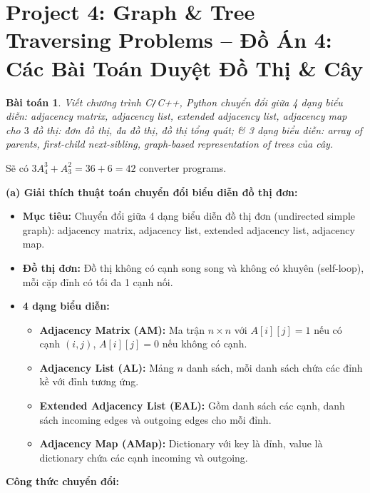 \documentclass{article}
\newtheorem{baitoan}{Bài toán}
\begin{document}

\section{Project 4: Graph \& Tree Traversing Problems -- Đồ Án 4: Các Bài Toán Duyệt Đồ Thị \& Cây}
\begin{baitoan}
    Viết chương trình {\sf C{\tt/}C++, Python} chuyển đổi giữa 4 dạng biểu diễn: adjacency matrix, adjacency list, extended adjacency list, adjacency map cho $3$ đồ thị: đơn đồ thị, đa đồ thị, đồ thị tổng quát; \& 3 dạng biểu diễn: array of parents, first-child next-sibling, graph-based representation of trees của cây.
\end{baitoan}
Sẽ có $3A_4^3 + A_3^2 = 36 + 6 = 42$ converter programs.


\textbf{(a) Giải thích thuật toán chuyển đổi biểu diễn đồ thị đơn:}

\begin{itemize}
    \item \textbf{Mục tiêu:} Chuyển đổi giữa 4 dạng biểu diễn đồ thị đơn (undirected simple graph): adjacency matrix, adjacency list, extended adjacency list, adjacency map.
    \item \textbf{Đồ thị đơn:} Đồ thị không có cạnh song song và không có khuyên (self-loop), mỗi cặp đỉnh có tối đa 1 cạnh nối.
    \item \textbf{4 dạng biểu diễn:}
    \begin{itemize}
        \item \textbf{Adjacency Matrix (AM):} Ma trận $n \times n$ với $A[i][j] = 1$ nếu có cạnh $(i,j)$, $A[i][j] = 0$ nếu không có cạnh.
        \item \textbf{Adjacency List (AL):} Mảng $n$ danh sách, mỗi danh sách chứa các đỉnh kề với đỉnh tương ứng.
        \item \textbf{Extended Adjacency List (EAL):} Gồm danh sách các cạnh, danh sách incoming edges và outgoing edges cho mỗi đỉnh.
        \item \textbf{Adjacency Map (AMap):} Dictionary với key là đỉnh, value là dictionary chứa các cạnh incoming và outgoing.
    \end{itemize}
\end{itemize}

\textbf{Công thức chuyển đổi:}
\end{document}
